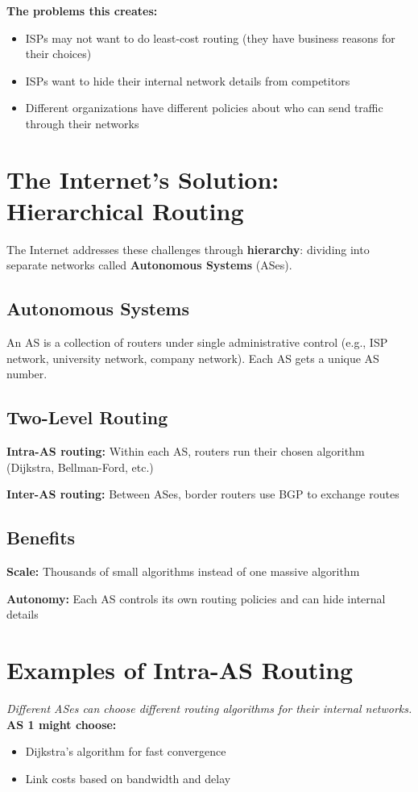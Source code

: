 \documentclass[../../compsys.tex]{subfiles}
\begin{document}
\textbf{The problems this creates:}
\begin{itemize}
    \item ISPs may not want to do least-cost routing (they have business reasons for their choices)
    \item ISPs want to hide their internal network details from competitors
    \item Different organizations have different policies about who can send traffic through their networks
\end{itemize}
\newpage
\section{The Internet's Solution: Hierarchical Routing}
The Internet addresses these challenges through \textbf{hierarchy}: dividing into separate networks called \textbf{Autonomous Systems} (ASes).

\subsection{Autonomous Systems}
An AS is a collection of routers under single administrative control (e.g., ISP network, university network, company network). Each AS gets a unique AS number.

\subsection{Two-Level Routing}
\textbf{Intra-AS routing:} Within each AS, routers run their chosen algorithm (Dijkstra, Bellman-Ford, etc.)

\textbf{Inter-AS routing:} Between ASes, border routers use BGP to exchange routes

\subsection{Benefits}
\textbf{Scale:} Thousands of small algorithms instead of one massive algorithm

\textbf{Autonomy:} Each AS controls its own routing policies and can hide internal details

\section{Examples of Intra-AS Routing}
\textit{Different ASes can choose different routing algorithms for their internal networks.}\\[10px]
\textbf{AS 1 might choose:}
\begin{itemize}
    \item Dijkstra's algorithm for fast convergence
    \item Link costs based on bandwidth and delay
\end{itemize}
\end{document}
